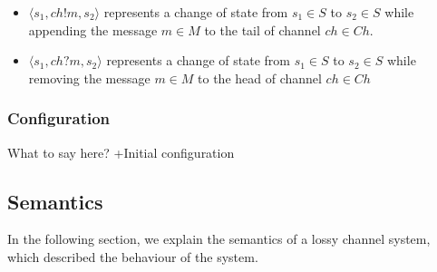 \begin{itemize}
\item[]
$\langle s_1, ch!m, s_2\rangle$ represents a change of state from $s_1\in S$ to $s_2\in S$ while appending the message $m\in M$ to the tail of channel $ch\in Ch$.
\item[]
$\langle s_1, ch?m, s_2\rangle$ represents a change of state from $s_1\in S$ to $s_2\in S$ while removing the message $m\in M$ to the head of channel $ch \in Ch$
\end{itemize}

\subsubsection{Configuration}
What to say here?
+Initial configuration

\subsection{Semantics}
In the following section, we explain the semantics of a lossy channel system, which described the behaviour of the system.

